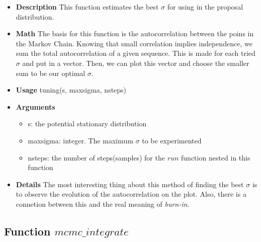 \documentclass{article}
\begin{document}
\begin{itemize}
    \item \textbf{Description}\newline
    This function estimates the best $\sigma$ for using in the proposal distribution.
    
    \item \textbf{Math}\newline
    The basis for this function is the autocorrelation between the poins in the Markov Chain. Knowing that small correlation implies independence, we sum the total autocorrelation of a given sequence. This is made for each tried $\sigma$ and put in a vector. Then, we can plot this vector and choose the smaller sum to be our optimal $\sigma$. 
    
    \item \textbf{Usage}\newline
    tuning(s, maxsigma, nsteps)
    
    \item \textbf{Arguments}
    
    \begin{itemize}
        \item s: the potential stationary distribution 
        \item maxsigma: integer. The maximum $\sigma$ to be experimented
        \item nsteps: the number of steps(samples) for the $run$ function nested in this function
    \end{itemize}
    \item \textbf{Details}\newline
    The most interesting thing about this method of finding the best $\sigma$ is to observe the evolution of the autocorrelation on the plot. Also, there is a connetion between this and the real meaning of \textit{burn-in}.
\end{itemize}

\subsection{Function $mcmc\_integrate$}
\end{document}
